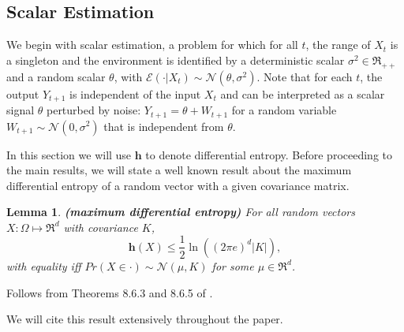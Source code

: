 \documentclass[twoside,11pt]{article}
\renewenvironment{proof}{\par\noindent{\bf Proof\ }}{\hfill\BlackBox\\[2mm]}
\newenvironment{proof}{\par\noindent{\bf Proof\ }}{\hfill\BlackBox\\[2mm]}
\newtheorem{lemma}[theorem]{Lemma}
\def\environment{\mathcal{E}}
\def\normal{\mathcal{N}}
\def\diffentropy{\bf h}
\def\diffentropy{\mathbf{h}}
\begin{document}
\subsection{Scalar Estimation}
We begin with scalar estimation, a problem for which for all $t$, the range of $X_t$ is a singleton and the environment is identified by a deterministic scalar $\sigma^2 \in \Re_{++}$ and a random scalar $\theta$, with $\environment(\cdot|X_t) \sim \normal(\theta, \sigma^2)$. Note that for each $t$, the output $Y_{t+1}$ is independent of the input $X_t$ and can be interpreted as a scalar signal $\theta$ perturbed by noise: $Y_{t+1} = \theta + W_{t+1}$ for a random variable $W_{t+1} \sim \mathcal{N}(0,\sigma^2)$ that is independent from $\theta$.

In this section we will use $\diffentropy$ to denote differential entropy. Before proceeding to the main results, we will state a well known result about the maximum differential entropy of a random vector with a given covariance matrix.

\begin{lemma}{\bf (maximum differential entropy)}
\label{le:max_entropy}
For all random vectors $X: \Omega \mapsto \Re^d$ with covariance $K$,
$$\diffentropy(X) \leq \frac{1}{2}\ln\left((2\pi e)^d|K|\right),$$
with equality iff $Pr(X\in\cdot) \sim \mathcal{N}(\mu, K)$ for some $\mu \in\Re^d$.
\end{lemma}
\begin{proof}
    Follows from Theorems 8.6.3 and 8.6.5 of \cite{10.5555/1146355}.
\end{proof}

We will cite this result extensively throughout the paper.\newline
\end{document}
